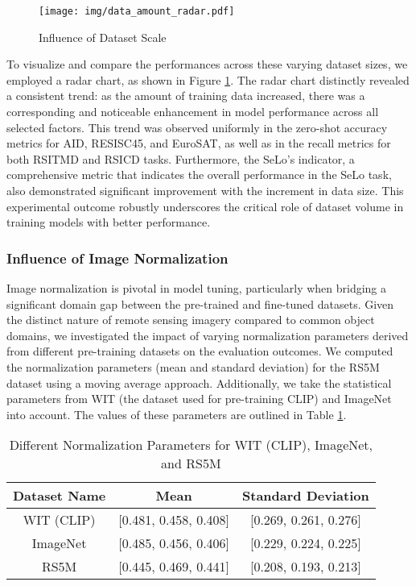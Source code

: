 \documentclass[journal]{IEEEtran}
\begin{document}
\begin{figure}
    \centering
    \texttt{[image: img/data\_amount\_radar.pdf]}
    \caption{Influence of Dataset Scale}
    \label{fig:data_amount}
\end{figure}

To visualize and compare the performances across these varying dataset sizes, we employed a radar chart, as shown in Figure \ref{fig:data_amount}. The radar chart distinctly revealed a consistent trend: as the amount of training data increased, there was a corresponding and noticeable enhancement in model performance across all selected factors. This trend was observed uniformly in the zero-shot accuracy metrics for AID, RESISC45, and EuroSAT, as well as in the recall metrics for both RSITMD and RSICD tasks. Furthermore, the SeLo's  indicator, a comprehensive metric that indicates the overall performance in the SeLo task, also demonstrated significant improvement with the increment in data size. This experimental outcome robustly underscores the critical role of dataset volume in training models with better performance.

\subsubsection{Influence of Image Normalization}


Image normalization is pivotal in model tuning, particularly when bridging a significant domain gap between the pre-trained and fine-tuned datasets. Given the distinct nature of remote sensing imagery compared to common object domains, we investigated the impact of varying normalization parameters derived from different pre-training datasets on the evaluation outcomes. We computed the normalization parameters (mean and standard deviation) for the RS5M dataset using a moving average approach. Additionally, we take the statistical parameters from WIT (the dataset used for pre-training CLIP) and ImageNet into account. The values of these parameters are outlined in Table \ref{table:norm_param}.

\begin{table}[ht]
\caption{Different Normalization Parameters for WIT (CLIP), ImageNet, and RS5M}
\label{table:norm_param}
\centering
\begin{tabular}{|c|c|c|}
\toprule
Dataset Name & Mean & Standard Deviation \\
\midrule
WIT (CLIP) &[0.481, 0.458, 0.408]	& [0.269, 0.261, 0.276] \\
\midrule
ImageNet & [0.485, 0.456, 0.406]	& [0.229, 0.224, 0.225] \\
\midrule
RS5M  & [0.445, 0.469, 0.441]	& [0.208, 0.193, 0.213] \\
\bottomrule
\end{tabular}
\end{table}
\end{document}

